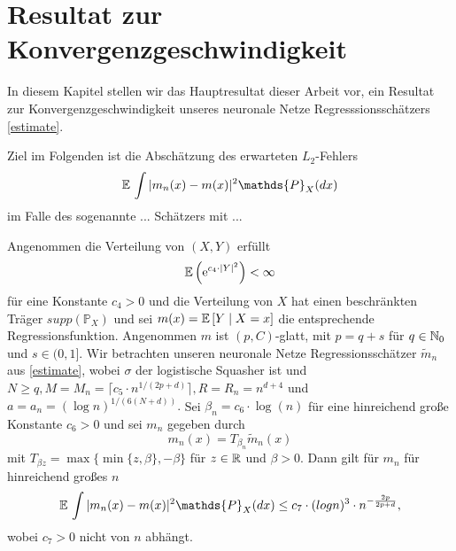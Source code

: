 \chapter{Resultat zur Konvergenzgeschwindigkeit}
\label{chap:3}

In diesem Kapitel stellen wir das Hauptresultat dieser Arbeit vor, ein Resultat zur Konvergenzgeschwindigkeit unseres neuronale Netze Regresssionsschätzers \ref{estimate}.

Ziel im Folgenden ist die Abschätzung des erwarteten $L_2$-Fehlers 
$$\E \int |m_n(x) - m(x)|^2  \mathds{P}_X(dx)$$
im Falle des sogenannte ... Schätzers mit ... 

\begin{thm}\label{optstop}
Angenommen die Verteilung von $(X,Y)$ erfüllt 
$$ \mathbb{E}\,\Big(\mathrm{e}^{c_4 \cdot |Y|^2}\Big) < \infty$$
für eine Konstante $c_4 > 0$ und die Verteilung von $X$ hat einen beschränkten Träger $supp(\mathds{P}_X)$ und sei $m(x) = \mathbb{E}\,[Y \mid X = x]$ die entsprechende Regressionsfunktion. 
Angenommen $m$ ist $(p,C)$-glatt, mit $p = q + s$ für $q \in \mathbb{N}_0$ und $s \in (0,1].$ Wir betrachten unseren neuronale Netze Regressionsschätzer $\tilde{m}_n$ aus \ref{estimate}, wobei $\sigma$ der logistische Squasher ist und $N \geq q, M = M_n = \lceil c_5 \cdot n^{1/(2p + d)}\rceil, R = R_n = n^{d + 4}$ und $a = a_n = (\log n)^{1/(6(N + d))}.$
Sei $\beta_n = c_6 \cdot \log(n)$ für eine hinreichend große Konstante $c_6 > 0$ und sei $m_n$ gegeben durch
$$m_n(x) = T_{\beta_n}\tilde{m}_n (x)$$
mit $T_{\beta z} = \max\{\min\{z, \beta\}, -\beta\}$ für $z \in \mathbb{R}$ und $\beta > 0.$ Dann gilt für $m_n$ für hinreichend großes $n$
$$\E \int |m_n(x) - m(x)|^2  \mathds{P}_X(dx) \leq c_7 \cdot (log n)^3 \cdot n^{- \frac{2p}{2p + d}},$$
wobei $c_7 > 0$ nicht von $n$ abhängt.
\end{thm}
